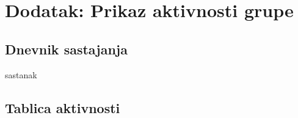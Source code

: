 \chapter*{Dodatak: Prikaz aktivnosti grupe}
		
		\section*{Dnevnik sastajanja}
		
%		
%		
		
		\begin{packed_enum}
			\item sastanak
			
%			
%			
%			
			
		\end{packed_enum}
		
		\eject
		\section*{Tablica aktivnosti}
		
